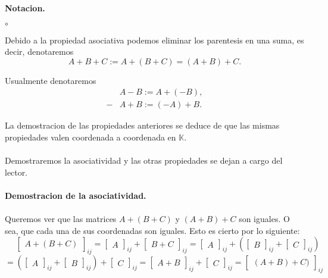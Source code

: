 \documentclass{article}
\theoremstyle{definition}
\theoremstyle{definition}
\theoremstyle{remark}
\begin{document}
\textbf{Notacion.}
\begin{list}{$\circ$}{}  
\item  Debido a la propiedad asociativa podemos eliminar los parentesis en una suma, es decir, denotaremos \[
  A+B+C := A+(B+C)=(A+B)+C.\]
\item Usualmente denotaremos \[ \begin{aligned}
    &A-B :=A+(-B), \\
    -&A+B:=(-A)+B.
  \end{aligned}
  \]
\end{list}
La demostracion de las propiedades anteriores se deduce de que las mismas propiedades valen coordenada a coordenada en $\mathbb{K}$.\\\\
Demostraremos la asociatividad y las otras propiedades se dejan a cargo del lector.
\\\\
\textbf{Demostracion de la asociatividad.} \\\\
Queremos ver que las matrices $A+(B+C)$ y $(A+B)+C$ son iguales. O sea, que cada una de sus coordenadas son iguales. Esto es cierto por lo siguiente: \[
  \phantom{=}\begin{bmatrix}A+(B+C)\end{bmatrix}_{ij}=\begin{bmatrix}A\end{bmatrix}_{ij}+\begin{bmatrix}B+C\end{bmatrix}_{ij}=\begin{bmatrix}A\end{bmatrix}_{ij}+\left(\begin{bmatrix}B\end{bmatrix}_{ij}+ \begin{bmatrix}C\end{bmatrix}_{ij} \right) 
\]
\[
  = \left( \begin{bmatrix} A \end{bmatrix}_{ij} + \begin{bmatrix}B\end{bmatrix}_{ij} \right) + \begin{bmatrix}C \end{bmatrix}_{ij}=\begin{bmatrix}A+B\end{bmatrix}_{ij}+\begin{bmatrix}C\end{bmatrix}_{ij}=\begin{bmatrix}(A+B)+C)\end{bmatrix}_{ij}
\]
\end{document}
